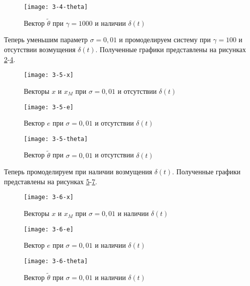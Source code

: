 \documentclass[14pt, a4paper]{extarticle}
\begin{document}
\begin{enumerate}
		\begin{figure}[H]
			\centering
			\texttt{[image: 3-4-theta]}
			\caption{Вектор $\tilde{\theta}$ при $\gamma=1000$ и наличии $\delta(t)$}
			\label{fig:3-4-theta}
		\end{figure}
		
		Теперь уменьшим параметр $\sigma=0,01$ и промоделируем систему при $\gamma=100$ и отсутствии возмущения $\delta(t)$. Полученные графики представлены на рисунках \ref{fig:3-5-x}-\ref{fig:3-5-theta}.
		
		\begin{figure}[H]
			\centering
			\texttt{[image: 3-5-x]}
			\caption{Векторы $x$ и $x_M$ при $\sigma=0,01$ и отсутствии $\delta(t)$}
			\label{fig:3-5-x}
		\end{figure}
		
		\begin{figure}[H]
			\centering
			\texttt{[image: 3-5-e]}
			\caption{Вектор $e$ при $\sigma=0,01$ и отсутствии $\delta(t)$}
			\label{fig:3-5-e}
		\end{figure}
		
		\begin{figure}[H]
			\centering
			\texttt{[image: 3-5-theta]}
			\caption{Вектор $\tilde{\theta}$ при $\sigma=0,01$ и отсутствии $\delta(t)$}
			\label{fig:3-5-theta}
		\end{figure}
		
		Теперь промоделируем при наличии возмущения $\delta(t)$. Полученные графики представлены на рисунках \ref{fig:3-6-x}-\ref{fig:3-6-theta}.
		
		\begin{figure}[H]
			\centering
			\texttt{[image: 3-6-x]}
			\caption{Векторы $x$ и $x_M$ при $\sigma=0,01$ и наличии $\delta(t)$}
			\label{fig:3-6-x}
		\end{figure}
		
		\begin{figure}[H]
			\centering
			\texttt{[image: 3-6-e]}
			\caption{Вектор $e$ при $\sigma=0,01$ и наличии $\delta(t)$}
			\label{fig:3-6-e}
		\end{figure}
		
		\begin{figure}[H]
			\centering
			\texttt{[image: 3-6-theta]}
			\caption{Вектор $\tilde{\theta}$ при $\sigma=0,01$ и наличии $\delta(t)$}
			\label{fig:3-6-theta}
		\end{figure}
		
	\end{enumerate}
\end{document}
